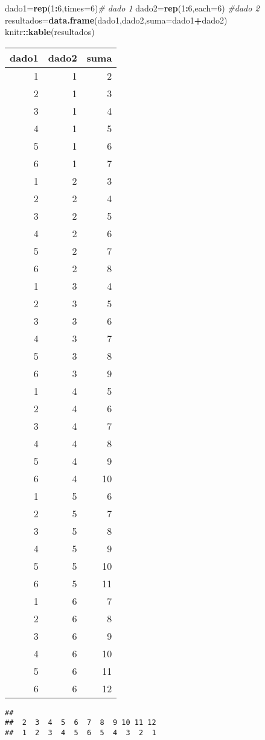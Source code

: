 \documentclass[
]{article}
\newenvironment{Shaded}{\begin{snugshade}}{\end{snugshade}}
\newcommand{\CommentTok}[1]{\textcolor[rgb]{0.56,0.35,0.01}{\textit{#1}}}
\newcommand{\DataTypeTok}[1]{\textcolor[rgb]{0.13,0.29,0.53}{#1}}
\newcommand{\DecValTok}[1]{\textcolor[rgb]{0.00,0.00,0.81}{#1}}
\newcommand{\KeywordTok}[1]{\textcolor[rgb]{0.13,0.29,0.53}{\textbf{#1}}}
\newcommand{\NormalTok}[1]{#1}
\newcommand{\OperatorTok}[1]{\textcolor[rgb]{0.81,0.36,0.00}{\textbf{#1}}}
\begin{document}
\begin{Shaded}
\begin{Highlighting}[]
\NormalTok{dado1=}\KeywordTok{rep}\NormalTok{(}\DecValTok{1}\OperatorTok{:}\DecValTok{6}\NormalTok{,}\DataTypeTok{times=}\DecValTok{6}\NormalTok{)}\CommentTok{\# dado 1}
\NormalTok{dado2=}\KeywordTok{rep}\NormalTok{(}\DecValTok{1}\OperatorTok{:}\DecValTok{6}\NormalTok{,}\DataTypeTok{each=}\DecValTok{6}\NormalTok{) }\CommentTok{\#dado 2}
\NormalTok{resultados=}\KeywordTok{data.frame}\NormalTok{(dado1,dado2,}\DataTypeTok{suma=}\NormalTok{dado1}\OperatorTok{+}\NormalTok{dado2)}
\NormalTok{knitr}\OperatorTok{::}\KeywordTok{kable}\NormalTok{(resultados)}
\end{Highlighting}
\end{Shaded}

\begin{longtable}[]{@{}rrr@{}}
\toprule
dado1 & dado2 & suma\tabularnewline
\midrule
\endhead
1 & 1 & 2\tabularnewline
2 & 1 & 3\tabularnewline
3 & 1 & 4\tabularnewline
4 & 1 & 5\tabularnewline
5 & 1 & 6\tabularnewline
6 & 1 & 7\tabularnewline
1 & 2 & 3\tabularnewline
2 & 2 & 4\tabularnewline
3 & 2 & 5\tabularnewline
4 & 2 & 6\tabularnewline
5 & 2 & 7\tabularnewline
6 & 2 & 8\tabularnewline
1 & 3 & 4\tabularnewline
2 & 3 & 5\tabularnewline
3 & 3 & 6\tabularnewline
4 & 3 & 7\tabularnewline
5 & 3 & 8\tabularnewline
6 & 3 & 9\tabularnewline
1 & 4 & 5\tabularnewline
2 & 4 & 6\tabularnewline
3 & 4 & 7\tabularnewline
4 & 4 & 8\tabularnewline
5 & 4 & 9\tabularnewline
6 & 4 & 10\tabularnewline
1 & 5 & 6\tabularnewline
2 & 5 & 7\tabularnewline
3 & 5 & 8\tabularnewline
4 & 5 & 9\tabularnewline
5 & 5 & 10\tabularnewline
6 & 5 & 11\tabularnewline
1 & 6 & 7\tabularnewline
2 & 6 & 8\tabularnewline
3 & 6 & 9\tabularnewline
4 & 6 & 10\tabularnewline
5 & 6 & 11\tabularnewline
6 & 6 & 12\tabularnewline
\bottomrule
\end{longtable}

\begin{Shaded}
\end{Shaded}

\begin{verbatim}
## 
##  2  3  4  5  6  7  8  9 10 11 12 
##  1  2  3  4  5  6  5  4  3  2  1
\end{verbatim}
\end{document}
